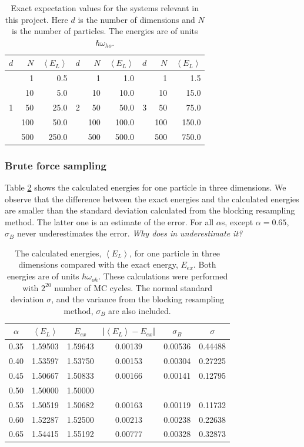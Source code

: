 \begin{table}[H]\caption{Exact expectation values for the systems relevant in this project. Here $d$ is the number of dimensions and $N$ is the number of particles. The energies are of units $\hbar \omega_{ho}$.}\label{tab:exact_values}
\center
\begin{tabular}{rrr|rrr|rrr}
$d$ & $N$ & $\left< E_L \right>$ &$d$ & $N$ & $\left< E_L \right>$&$d$ & $N$ & $\left< E_L \right>$\\ \hline
&1 & 0.5 &&1 & 1.0 &&1 & 1.5\\
&10 & 5.0&&10 & 10.0 &&10 & 15.0\\
1& 50 & 25.0 &2& 50 & 50.0& 3& 50 & 75.0 \\
&100 & 50.0 &&100 & 100.0 &&100 & 150.0 \\
&500 & 250.0 &&500 & 500.0& &500 & 750.0 \\ 
\end{tabular}
\end{table}

 \subsubsection{Brute force sampling}
 
Table \ref{tab:brute_force_N_1_MC_20} shows the calculated energies for one particle in three dimensions. We observe that the difference between the exact energies and the calculated energies are smaller than the standard deviation calculated from the blocking resampling method. The latter one is an estimate of the error. For all $\alpha$s, except $\alpha = 0.65$, $\sigma_B$ never underestimates the error. \textit{Why does in underestimate it?}

\begin{table}[H]\caption{The calculated energies, $\left<E_L\right>$, for one particle in three dimensions compared with the exact energy, $E_{ex}$. Both energies are of units $\hbar\omega_{oh}$. These calculations were performed with $2^{20}$ number of MC cycles. The normal standard deviation $\sigma$, and the variance from the blocking resampling method, $\sigma_B$ are also included. }\label{tab:brute_force_N_1_MC_20}
\center
\begin{tabular}{cccccc}
$\alpha$ & $\left< E_L \right>$ & $E_{ex}$ & |$\left< E_L \right>-E_{ex}$|  & $\sigma_B$ & $\sigma$\\ \hline
0.35 & 1.59503 & 1.59643 & 0.00139 & 0.00536 & 0.44488\\
0.40 & 1.53597 & 1.53750 & 0.00153 & 0.00304 & 0.27225\\
0.45 & 1.50667 & 1.50833 & 0.00166 & 0.00141 & 0.12795\\
0.50 & 1.50000 & 1.50000 &                &                &                 \\
0.55 & 1.50519 & 1.50682 & 0.00163 & 0.00119 & 0.11732\\
0.60 & 1.52287 & 1.52500 & 0.00213 & 0.00238 & 0.22638\\
0.65 & 1.54415 & 1.55192 & 0.00777 & 0.00328 & 0.32873\\
\end{tabular}
\end{table} 

